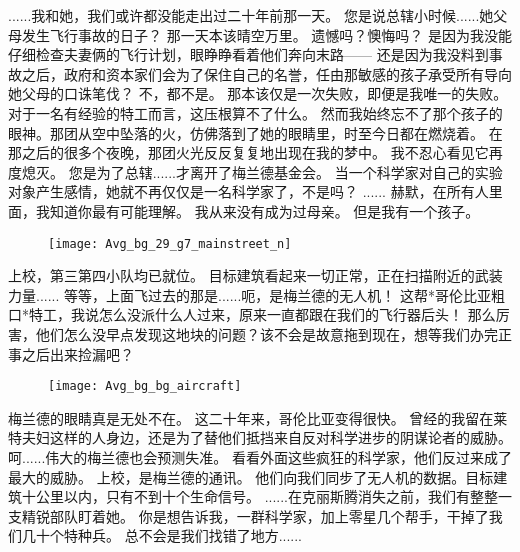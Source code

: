 \documentclass[openany]{book}
\begin{document}
\begin{dialogue}
     ......我和她，我们或许都没能走出过二十年前那一天。
     您是说总辖小时候......她父母发生飞行事故的日子？
     那一天本该晴空万里。
     遗憾吗？懊悔吗？
     是因为我没能仔细检查夫妻俩的飞行计划，眼睁睁看着他们奔向末路——
     还是因为我没料到事故之后，政府和资本家们会为了保住自己的名誉，任由那敏感的孩子承受所有导向她父母的口诛笔伐？
     不，都不是。
     那本该仅是一次失败，即便是我唯一的失败。对于一名有经验的特工而言，这压根算不了什么。
     然而我始终忘不了那个孩子的眼神。那团从空中坠落的火，仿佛落到了她的眼睛里，时至今日都在燃烧着。
     在那之后的很多个夜晚，那团火光反反复复地出现在我的梦中。
     我不忍心看见它再度熄灭。
     您是为了总辖......才离开了梅兰德基金会。
     当一个科学家对自己的实验对象产生感情，她就不再仅仅是一名科学家了，不是吗？
     ......
     赫默，在所有人里面，我知道你最有可能理解。
     我从来没有成为过母亲。
     但是我有一个孩子。
    \begin{figure}[h]
        \centering
        \texttt{[image: Avg\_bg\_29\_g7\_mainstreet\_n]}
    \end{figure}
     上校，第三第四小队均已就位。
     目标建筑看起来一切正常，正在扫描附近的武装力量......
     等等，上面飞过去的那是......呃，是梅兰德的无人机！
     这帮*哥伦比亚粗口*特工，我说怎么没派什么人过来，原来一直都跟在我们的飞行器后头！
     那么厉害，他们怎么没早点发现这地块的问题？该不会是故意拖到现在，想等我们办完正事之后出来捡漏吧？
    \begin{figure}[h]
        \centering
        \texttt{[image: Avg\_bg\_bg\_aircraft]}
    \end{figure}
     梅兰德的眼睛真是无处不在。
     这二十年来，哥伦比亚变得很快。
     曾经的我留在莱特夫妇这样的人身边，还是为了替他们抵挡来自反对科学进步的阴谋论者的威胁。
     呵......伟大的梅兰德也会预测失准。
     看看外面这些疯狂的科学家，他们反过来成了最大的威胁。
     上校，是梅兰德的通讯。
     他们向我们同步了无人机的数据。目标建筑十公里以内，只有不到十个生命信号。
     ......在克丽斯腾消失之前，我们有整整一支精锐部队盯着她。
     你是想告诉我，一群科学家，加上零星几个帮手，干掉了我们几十个特种兵。
     总不会是我们找错了地方......

\end{dialogue}
\end{document}
